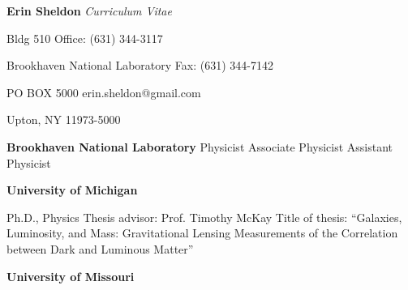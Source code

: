\begin{center}
  {\LARGE {\bf Erin Sheldon}}
  {\large {\it Curriculum Vitae}}
\end{center}

%
%


\noindent
{Bldg 510} \hfill {Office: (631) 344-3117}

\noindent 
{Brookhaven National Laboratory} \hfill {Fax: (631) 344-7142}

\noindent
{PO BOX 5000} \hfill {erin.sheldon@gmail.com}

\noindent
{Upton, NY 11973-5000} %







\ssp
\ssp
\noindent
{}
{\bf Brookhaven National Laboratory}
\normalsize
\newline
\makebox[1.25in][l]{}
	{{Physicist}}
	\hfill
\newline
\makebox[1.25in][l]{}
	{{Associate Physicist}}
	\hfill
\newline
\makebox[1.25in][l]{}
	{{Assistant Physicist}}
	\hfill

\ssp
\ssp
\noindent
{}
{\bf University of Michigan}
\hfill
{}
\normalsize

\tsp
\noindent
\makebox[1.25in][l]{}
\parbox{5.40in}{
Ph.D., Physics\newline
Thesis advisor: Prof. Timothy McKay\newline
Title of thesis: ``Galaxies, Luminosity, and Mass: Gravitational Lensing Measurements of the Correlation between Dark and Luminous Matter''
}

\isp
\noindent
\makebox[1.25in][l]{}
{\bf University of Missouri}
\hfill
{}
\normalsize

